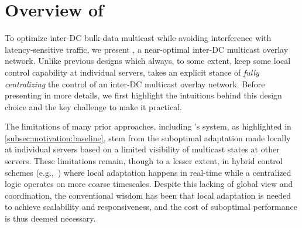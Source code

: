 \section{Overview of \name}
\label{sec:overview}

To optimize inter-DC bulk-data multicast while avoiding
interference with latency-sensitive traffic, we present \name,
a near-optimal inter-DC multicast overlay network.
Unlike previous designs which always, to some extent, keep
some local control capability at individual servers,
\name takes an explicit stance of {\em fully centralizing} the
control of an inter-DC multicast overlay network.
Before presenting \name in more details,
we first highlight the intuitions behind this design
choice and the key challenge to make it practical.







The limitations of many prior approaches, including \company's
system, as highlighted in \Section\ref{subsec:motivation:baseline},
stem from the suboptimal adaptation made locally
at individual servers
based on a limited visibility of multicast states at
other servers.
These limitations remain, though to a lesser extent, in hybrid
control schemes (e.g.,~\cite{yin2009design}) where local
adaptation happens in real-time while a centralized logic
operates on more coarse timescales.
Despite this lacking of global view and coordination, the
conventional wisdom has
been that local adaptation is needed to achieve
scalability and responsiveness, and the cost of suboptimal
performance is thus deemed necessary.

